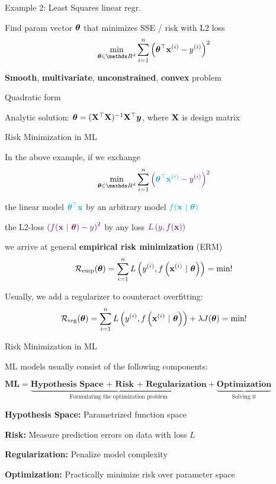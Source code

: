 \documentclass[11pt,compress,t,notes=noshow, xcolor=table]{beamer}
\begin{document}
\begin{framei}{Example 2: Least Squares linear regr.}
\item Find param vector $\bm{\theta}$ that minimizes SSE / risk with L2 loss
$$ \min_{\thetav \in \R^d} \sumin \left(\thetav^\top \xi - \yi\right)^2 $$
\vfill
{}
\item \textbf{Smooth}, \textbf{multivariate}, \textbf{unconstrained}, \textbf{convex} problem
\item Quadratic form
\item Analytic solution: $\bm{\theta} = (\mathbf{X}^\top \mathbf{X})^{-1}\mathbf{X}^\top \bm{y}$, where $\mathbf{X}$ is design matrix
\end{framei}


\begin{framei}{Risk Minimization in ML}
\item In the above example, if we exchange
$$ \min_{\thetav \in \R^d} \sum_{i = 1}^n \textcolor{violet}{\left(\textcolor{cyan}{\thetav^\top \xi} - \yi\right)^2} $$
\item the linear model $\textcolor{cyan}{\bm{\theta}^\top \mathbf{x}}$ by an arbitrary model $\textcolor{cyan}{f(\mathbf{x} ~|~ \bm{\theta})}$
\item the L2-loss $\textcolor{violet}{\left(f(\mathbf{x} ~|~ \bm{\theta}) - y\right)^2}$ by any loss $\textcolor{violet}{L\left(y, f(\mathbf{x})\right)}$
\item we arrive at general \textbf{empirical risk minimization} (ERM)
$$ \mathcal{R}_{\text{emp}}(\bm{\theta}) = \sum\limits_{i=1}^n L\left(y^{(i)}, f\left(\mathbf{x}^{(i)} ~|~ \bm{\theta}\right)\right) = \textrm{min}! $$
\item Usually, we add a regularizer to counteract overfitting:
$$ \mathcal{R}_{\text{reg}}(\bm{\theta}) =  \sum\limits_{i=1}^n L\left(y^{(i)}, f\left(\mathbf{x}^{(i)} ~|~ \bm{\theta}\right)\right) + \lambda J(\bm{\theta}) = \textrm{min}! $$
\end{framei}


\begin{framei}[sep=L]{Risk Minimization in ML}
\item ML models usually consist of the following components:\\
\begin{small}$\textbf{ML} = \underbrace{\textbf{Hypothesis Space + Risk + Regularization}}_{\text{Formulating the optimization problem}} + \underbrace{\textbf{Optimization}}_{\text{Solving it}}$\end{small}
\item \textbf{Hypothesis Space:} Parametrized function space
\item \textbf{Risk:} Measure prediction errors on data with loss $L$
\item \textbf{Regularization:} Penalize model complexity
\item \textbf{Optimization:} Practically minimize risk over parameter space
\end{framei}
\end{document}
